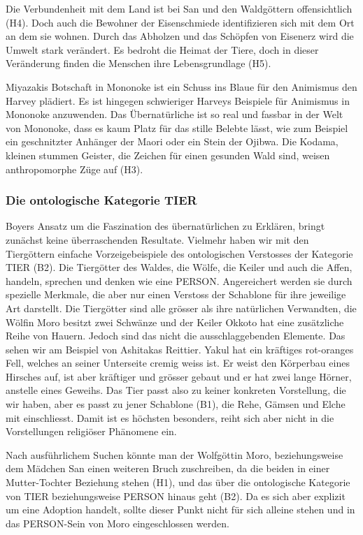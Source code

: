 Die Verbundenheit mit dem Land ist bei San und den Waldgöttern offensichtlich (H4). Doch auch die Bewohner der Eisenschmiede identifizieren sich mit dem Ort an dem sie wohnen. Durch das Abholzen und das Schöpfen von Eisenerz wird die Umwelt stark verändert. Es bedroht die Heimat der Tiere, doch in dieser Veränderung finden die Menschen ihre Lebensgrundlage (H5).

Miyazakis Botschaft in Mononoke ist ein Schuss ins Blaue für den Animismus den Harvey plädiert. Es ist hingegen schwieriger Harveys Beispiele für Animismus in Mononoke anzuwenden. Das Übernatürliche ist so real und fassbar in der Welt von Mononoke, dass es kaum Platz für das stille Belebte lässt, wie zum Beispiel ein geschnitzter Anhänger der Maori oder ein Stein der Ojibwa. Die Kodama, kleinen stummen Geister, die Zeichen für einen gesunden Wald sind, weisen anthropomorphe Züge auf (H3). 

\subsubsection{Die ontologische Kategorie TIER} 
Boyers Ansatz um die Faszination des übernatürlichen zu Erklären, bringt zunächst keine überraschenden Resultate. Vielmehr haben wir mit den Tiergöttern einfache Vorzeigebeispiele des ontologischen Verstosses der Kategorie TIER (B2). Die Tiergötter des Waldes, die Wölfe, die Keiler und auch die Affen, handeln, sprechen und denken wie eine PERSON. Angereichert werden sie durch spezielle Merkmale, die aber nur einen Verstoss der Schablone für ihre jeweilige Art darstellt. Die Tiergötter sind alle grösser als ihre natürlichen Verwandten, die Wölfin Moro besitzt zwei Schwänze und der Keiler Okkoto hat eine zusätzliche Reihe von Hauern. Jedoch sind das nicht die ausschlaggebenden Elemente. Das sehen wir am Beispiel von Ashitakas Reittier. Yakul hat ein kräftiges rot-oranges Fell, welches an seiner Unterseite cremig weiss ist. Er weist den Körperbau eines Hirsches auf, ist aber kräftiger und grösser gebaut und er hat zwei lange Hörner, anstelle eines Geweihs. Das Tier passt also zu keiner konkreten Vorstellung, die wir haben, aber es passt zu jener Schablone (B1), die Rehe, Gämsen und Elche mit einschliesst. Damit ist es höchsten besonders, reiht sich aber nicht in die Vorstellungen religiöser Phänomene ein. 

Nach ausführlichem Suchen könnte man der Wolfgöttin Moro, beziehungsweise dem Mädchen San einen weiteren Bruch zuschreiben, da die beiden in einer Mutter-Tochter Beziehung stehen (H1), und das über die ontologische Kategorie von TIER beziehungsweise PERSON hinaus geht (B2). Da es sich aber explizit um eine Adoption handelt, sollte dieser Punkt nicht für sich alleine stehen und in das PERSON-Sein von Moro eingeschlossen werden. 

